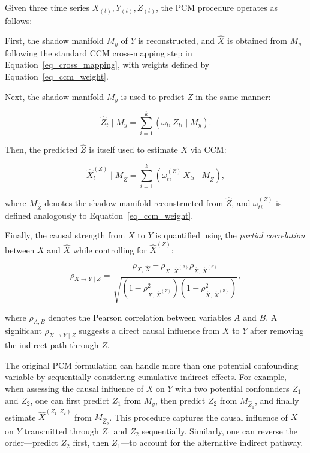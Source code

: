 \documentclass[authoryear,preprint,review,12pt]{elsarticle}
\begin{document}
Given three time series $X_{(t)}, Y_{(t)}, Z_{(t)}$, the PCM procedure operates as follows:

First, the shadow manifold $M_y$ of $Y$ is reconstructed, and $\hat{X}$ is obtained from $M_y$ following the standard CCM cross-mapping step in Equation~\eqref{eq_cross_mapping}, with weights defined by Equation~\eqref{eq_ccm_weight}.  

Next, the shadow manifold $M_y$ is used to predict $Z$ in the same manner:

\begin{equation}\label{eq_pcm_zhat}
\hat{Z}_t \mid M_y = \sum_{i=1}^k \left( \omega_{ti} \, Z_{ti} \mid M_y \right).
\end{equation}

Then, the predicted $\hat{Z}$ is itself used to estimate $X$ via CCM:

\begin{equation}\label{eq_pcm_x_zhat}
\hat{X}^{(Z)}_t \mid M_{\hat{Z}} = \sum_{i=1}^k \left( \omega^{(Z)}_{ti} \, X_{ti} \mid M_{\hat{Z}} \right),
\end{equation}

\noindent where $M_{\hat{Z}}$ denotes the shadow manifold reconstructed from $\hat{Z}$, and $\omega^{(Z)}_{ti}$ is defined analogously to Equation~\eqref{eq_ccm_weight}.

Finally, the causal strength from $X$ to $Y$ is quantified using the \emph{partial correlation} between $X$ and $\hat{X}$ while controlling for $\hat{X}^{(Z)}$:

\begin{equation}\label{eq_pcm_partial_corr}
\rho_{X \to Y \mid Z} = \frac{ \rho_{X,\, \hat{X}} - \rho_{X,\, \hat{X}^{(Z)}} \rho_{\hat{X},\, \hat{X}^{(Z)}} }
{\sqrt{\left( 1 - \rho_{X,\, \hat{X}^{(Z)}}^2 \right) \left( 1 - \rho_{\hat{X},\, \hat{X}^{(Z)}}^2 \right) }},
\end{equation}

\noindent where $\rho_{A,B}$ denotes the Pearson correlation between variables $A$ and $B$. A significant $\rho_{X \to Y \mid Z}$ suggests a direct causal influence from $X$ to $Y$ after removing the indirect path through $Z$.

The original PCM formulation can handle more than one potential confounding variable by sequentially considering cumulative indirect effects. For example, when assessing the causal influence of $X$ on $Y$ with two potential confounders $Z_1$ and $Z_2$, one can first predict $Z_1$ from $M_y$, then predict $Z_2$ from $M_{\hat{Z}_1}$, and finally estimate $\hat{X}^{(Z_1,Z_2)}$ from $M_{\hat{Z}_2}$. This procedure captures the causal influence of $X$ on $Y$ transmitted through $Z_1$ and $Z_2$ sequentially. Similarly, one can reverse the order—predict $Z_2$ first, then $Z_1$—to account for the alternative indirect pathway.
\end{document}
